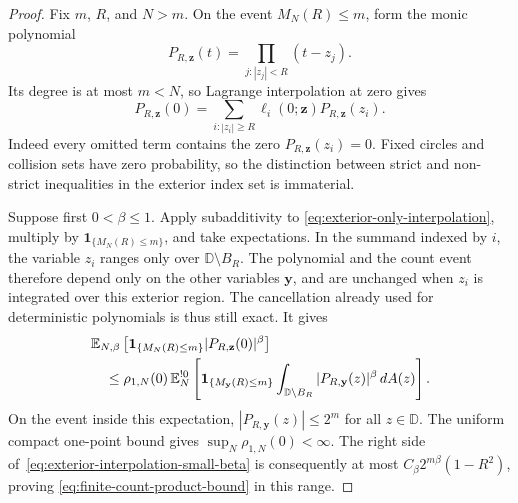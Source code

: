\documentclass[11pt,a4paper]{article}
\numberwithin{equation}{section}
\theoremstyle{definition}
\theoremstyle{remark}
\newcommand{\D}{\mathbb D}
\begin{document}
\begin{proof}
Fix $m$, $R$, and $N>m$. On the event $M_N(R)\le m$, form the
monic polynomial
\[
 P_{R,\mathbf z}(t)=\prod_{j:|z_j|<R}(t-z_j).
\]
Its degree is at most $m<N$, so Lagrange interpolation at zero
gives
\begin{equation}
 P_{R,\mathbf z}(0)
 =\sum_{i:|z_i|\ge R}\ell_i(0;\mathbf z)P_{R,\mathbf z}(z_i).
 \label{eq:exterior-only-interpolation}
\end{equation}
Indeed every omitted term contains the zero
$P_{R,\mathbf z}(z_i)=0$. Fixed circles and collision sets have
zero probability, so the distinction between strict and non-strict
inequalities in the exterior index set is immaterial.

Suppose first $0<\beta\le1$. Apply subadditivity to
\eqref{eq:exterior-only-interpolation}, multiply by
$\mathbf1_{\{M_N(R)\le m\}}$, and take expectations. In the
summand indexed by $i$, the variable $z_i$ ranges only over
$\D\setminus B_R$. The polynomial and the count event therefore
depend only on the other variables $\mathbf y$, and are unchanged
when $z_i$ is integrated over this exterior region. The cancellation
already used for deterministic polynomials is thus still exact.
It gives
\begin{align}
 &\mathbb E_{N,\beta}
 \left[\mathbf1_{\{M_N(R)\le m\}}
                       |P_{R,\mathbf z}(0)|^\beta\right]
 \notag\\
 &\quad\le \rho_{1,N}(0)\,
 \mathbb E_N^{!0}\left[
  \mathbf1_{\{M_{\mathbf y}(R)\le m\}}
  \int_{\D\setminus B_R}|P_{R,\mathbf y}(z)|^\beta\,dA(z)
                         \right].
 \label{eq:exterior-interpolation-small-beta}
\end{align}
On the event inside this expectation,
$|P_{R,\mathbf y}(z)|\le2^m$ for all $z\in\D$. The uniform
compact one-point bound gives $\sup_N\rho_{1,N}(0)<\infty$.
The right side of~\eqref{eq:exterior-interpolation-small-beta}
is consequently at most $C_\beta2^{m\beta}(1-R^2)$, proving
\eqref{eq:finite-count-product-bound} in this range.


\end{proof}
\end{document}
